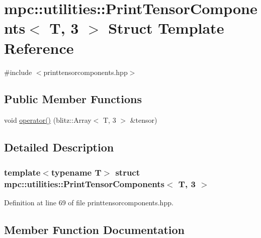 \hypertarget{structmpc_1_1utilities_1_1_print_tensor_components_3_01_t_00_013_01_4}{}\section{mpc\+:\+:utilities\+:\+:Print\+Tensor\+Components$<$ T, 3 $>$ Struct Template Reference}
\label{structmpc_1_1utilities_1_1_print_tensor_components_3_01_t_00_013_01_4}


{\ttfamily \#include $<$printtensorcomponents.\+hpp$>$}

\subsection*{Public Member Functions}
\begin{DoxyCompactItemize}
\item 
void \mbox{\hyperlink{structmpc_1_1utilities_1_1_print_tensor_components_3_01_t_00_013_01_4_aa6fae52410d39880ab27200c6aa43d0b}{operator()}} (blitz\+::\+Array$<$ T, 3 $>$ \&tensor)
\end{DoxyCompactItemize}


\subsection{Detailed Description}
\subsubsection*{template$<$typename T$>$\newline
struct mpc\+::utilities\+::\+Print\+Tensor\+Components$<$ T, 3 $>$}



Definition at line 69 of file printtensorcomponents.\+hpp.



\subsection{Member Function Documentation}
\mbox{\label{structmpc_1_1utilities_1_1_print_tensor_components_3_01_t_00_013_01_4_aa6fae52410d39880ab27200c6aa43d0b}} 
